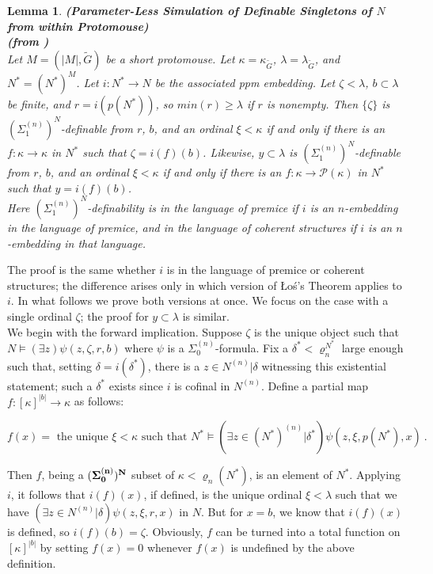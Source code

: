 \documentclass[12pt]{article}
\newtheorem{lem}[thm]{Lemma}
\begin{document}
\begin{lem} \label{translation1}
\textbf{(Parameter-Less Simulation of Definable Singletons of $N$ from within Protomouse)}\\
\textbf{(from \cite{zeman square proof})}\\
Let $M = (|M| , \tilde{G})$ be a short protomouse.  Let $\kappa = \kappa_{\tilde{G}}$, $ \lambda = \lambda_{\tilde{G}}$, and $N^* = (N^*)^M$.  Let $i: N^* \longrightarrow  N$ be the associated ppm embedding.  Let $\zeta < \lambda$, $b \subset \lambda$ be finite, and $r =  i (p (N^* ))$, so $min(r) \geq \lambda$ if $r$ is nonempty.  Then $\{ \zeta \}$ is $(\Sigma_1^{(n)})^N$-definable from $r$, $b$, and an ordinal $\xi < \kappa$ if and only if there is an $f: \kappa \longrightarrow \kappa$ in $N^*$ such that $\zeta = i (f)(b)$.  Likewise, $y \subset \lambda$ is $(\Sigma_1^{(n)})^N$-definable from $r$, $b$, and an ordinal $\xi < \kappa$ if and only if there is an $f: \kappa \longrightarrow \mathcal{P} ( \kappa )$ in $N^*$ such that $y = i (f)(b)$.\\


Here $(\Sigma_1^{(n)})^N$-definability is in the language of premice if $i$ is an $n$-embedding in the language of premice, and in the language of coherent structures if $i$ is an $n$-embedding in that language.
\end{lem}

The proof is the same whether $i$ is in the language of premice or coherent structures; the difference arises only in which version of {\L}o{\'s}'s Theorem applies to $i$.  In what follows we prove both versions at once.  We focus on the case with a single ordinal $\zeta$; the proof for $y \subset \lambda$ is similar.\\

We begin with the forward implication.  Suppose $\zeta$ is the unique object such that $N \models (\exists z) \psi ( z , \zeta , r , b )$ where $\psi$ is a $\Sigma_0^{(n)}$-formula.  Fix a $\delta^* < \varrho_n^{N^*}$ large enough such that, setting $\delta = i(\delta^* )$, there is a $z \in N^{(n)} | \delta$ witnessing this existential statement; such a $\delta^*$ exists since $i$ is cofinal in $N^{(n)}$.  Define a partial map $f: [ \kappa ]^{|b|} \longrightarrow \kappa$ as follows:

\[
f(x) = \text{ the unique } \xi < \kappa \text{ such that } N^* \models (\exists z \in (N^*)^{(n)} | \delta^* ) \psi (z , \xi , p (N^* ) , x ) \ .
\]

Then $f$, being a $(\bf{\Sigma}_0^{(n)})^N$ subset of $\kappa < \varrho_n (N^* )$, is an element of $N^*$.  Applying $i$, it follows that $i (f)(x)$, if defined, is the unique ordinal $\xi < \lambda$ such that we have $(\exists z \in N^{(n)} | \delta ) \psi (z, \xi , r , x )$ in $N$.  But for $x = b$, we know that $i (f) (x)$ is defined, so $i (f)(b) = \zeta$.  Obviously, $f$ can be turned into a total function on $[ \kappa ]^{|b|}$ by setting $f(x) = 0$ whenever $f(x)$ is undefined by the above definition.\\
\end{document}
